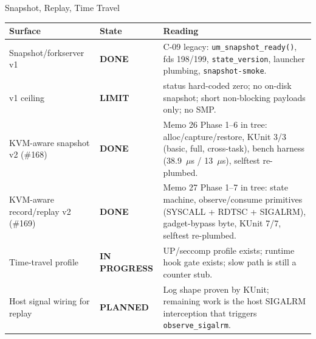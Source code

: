 \documentclass[aspectratio=169,11pt]{beamer}
\newcommand{\pill}[2]{\colorbox{#1!14}{\textcolor{#1}{\footnotesize\textbf{#2}}}}
\newcommand{\done}{\pill{UMLGreen}{DONE}}
\newcommand{\progress}{\pill{UMLAmber}{IN PROGRESS}}
\newcommand{\planned}{\pill{UMLBlue}{PLANNED}}
\newcommand{\limit}{\pill{UMLRed}{LIMIT}}
\begin{document}
\begin{frame}{Snapshot, Replay, Time Travel}
\scriptsize
\begin{tabularx}{\textwidth}{@{}p{}p{}X@{}}
\toprule
Surface & State & Reading \\
\midrule
Snapshot/forkserver v1 & \done & C-09 legacy: \texttt{um\_snapshot\_ready()},
fds 198/199, \texttt{state\_version}, launcher plumbing,
\texttt{snapshot-smoke}. \\
v1 ceiling & \limit & status hard-coded zero; no on-disk snapshot;
short non-blocking payloads only; no SMP. \\
KVM-aware snapshot v2 (\#168) & \done & Memo 26 Phase 1--6 in tree:
alloc/capture/restore, KUnit 3/3 (basic, full, cross-task), bench
harness (38.9~$\mu$s / 13~$\mu$s), selftest re-plumbed. \\
KVM-aware record/replay v2 (\#169) & \done & Memo 27 Phase 1--7 in tree:
state machine, observe/consume primitives (SYSCALL + RDTSC +
SIGALRM), gadget-bypass byte, KUnit 7/7, selftest re-plumbed. \\
Time-travel profile & \progress & UP/seccomp profile exists; runtime
hook gate exists; slow path is still a counter stub. \\
Host signal wiring for replay & \planned & Log shape proven by KUnit;
remaining work is the host SIGALRM interception that triggers
\texttt{observe\_sigalrm}. \\
\bottomrule
\end{tabularx}
\end{frame}
\end{document}

